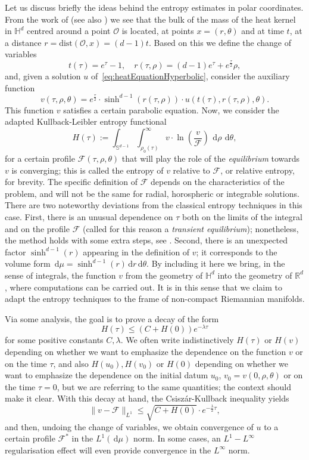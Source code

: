 \documentclass[12pt,longbibliography]{article}
\def\R{\mathbb{R}}
\def\d{\,\mathrm{d}}
\def\R{\mathbb{R}}
\def\d{\,\mathrm{d}}
\def\H{\mathbb{H}}
\theoremstyle{definition}
\theoremstyle{remark}
\theoremstyle{example}
\begin{document}
Let us discuss briefly the ideas behind the entropy estimates in polar coordinates. From the work of \cite{vazquez1992asymptotic} (see also \cite[Appendix A]{LM}) we see that the bulk of the mass of the heat kernel in $\H^d$ centred around a point $\mathcal{O}$ is located, at points $x=(r,\theta)$ and at time $t$, at a distance $r=\text{dist}(\mathcal{O}, x)= (d-1)t$. Based on this we define the change of variables
\[
t(\tau)=e^\tau - 1,\quad r(\tau, \rho) = (d-1)e^\tau + e^\frac{\tau}{2}\rho,
\]
and, given a solution $u$ of~\eqref{eq:heatEquationHyperbolic}, consider the auxiliary function
\[
v(\tau, \rho, \theta) = e^\frac{\tau}{2}\cdot \sinh^{d-1}(r(\tau, \rho))\cdot u(t(\tau), r(\tau, \rho), \theta).
\]
This function $v$ satisfies a certain parabolic equation. Now, we consider the adapted Kullback-Leibler entropy functional
\[
H(\tau):= \int_{\mathbb{S}^{d-1}}\int_{\rho_0(\tau)}^\infty v\cdot\ln\left(\frac{v}{\mathcal{F}}\right)\ \d \rho\ \d \theta,
\]
for a certain profile $\mathcal{F}(\tau, \rho, \theta)$ that will play the role of the \textit{equilibrium} towards $v$ is converging; this is called the entropy of $v$ relative to $\mathcal{F}$, or relative entropy, for brevity. The specific definition of $\mathcal{F}$ depends on the characteristics of the problem, and will not be the same for radial, horospheric or integrable solutions. There are two noteworthy deviations from the classical entropy techniques in this case. First, there is an unusual dependence on $\tau$ both on the limits of the integral and on the profile $\mathcal{F}$ (called for this reason a \textit{transient equilibrium}); nonetheless, the method holds with some extra steps, see \cite{CGQ}. Second, there is an unexpected factor $\sinh^{d-1}(r)$ appearing in the definition of $v$; it corresponds to the volume form $\d\mu = \sinh^{d-1}(r) \d r \d  \theta$. By including it here we bring, in the sense of integrals, the function $v$ from the geometry of $\H^d$ into the geometry of $\R^d$, where computations can be carried out. It is in this sense that we claim to adapt the entropy techniques to the frame of non-compact Riemannian manifolds.

Via some analysis, the goal is to prove a decay of the form
\[
H(\tau)\leq (C+H(0))e^{-\lambda \tau}
\]
for some positive constants $C, \lambda$. We often write indistinctively $H(\tau)$ or $H(v)$ depending on whether we want to emphasize the dependence on the function $v$ or on the time $\tau$, and also $H(u_0), H(v_0)$ or $H(0)$ depending on whether we want to emphasize the dependence on the initial datum $u_0$, $v_0=v(0, \rho, \theta)$ or on the time $\tau=0$, but we are referring to the same quantities; the context should make it clear. With this decay at hand, the Csiszár-Kullback inequality yields
\[
\|v-\mathcal{F}\|_{L^1}\leq \sqrt{C+H(0)}\cdot e^{-\frac{\lambda}{2}\tau},
\]
and then, undoing the change of variables, we obtain convergence of $u$ to a certain profile $\mathcal{F}^*$ in the $L^1(\d\mu)$ norm. In some cases, an $L^1-L^\infty$ regularisation effect will even provide convergence in the $L^\infty$ norm.
\end{document}
